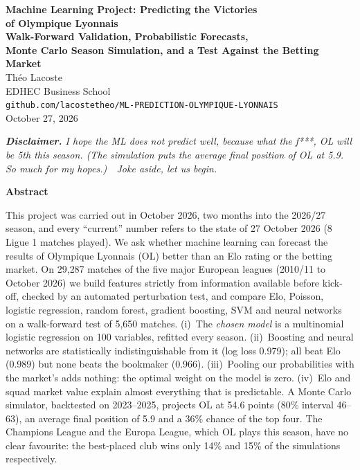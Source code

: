 \documentclass[11pt,a4paper]{article}
\theoremstyle{definition}
\theoremstyle{remark}
\begin{document}
\thispagestyle{fancy}
\begin{center}
{\Large\bfseries Machine Learning Project: Predicting the Victories\\[2pt] of Olympique Lyonnais}\\[10pt]
{\large\bfseries Walk-Forward Validation, Probabilistic Forecasts,\\[1pt] Monte Carlo Season Simulation, and a Test Against the Betting Market}\\[16pt]
{\large Théo Lacoste}\\[2pt]
{\small EDHEC Business School}\\[2pt]
{\small \texttt{github.com/lacostetheo/ML-PREDICTION-OLYMPIQUE-LYONNAIS}}\\[10pt]
{\normalsize October 27, 2026}
\end{center}
\vspace{2pt}
\begin{center}\begin{minipage}{0.88\textwidth}\small\itshape
\textbf{Disclaimer.} I hope the ML does not predict well, because what the f***, OL will be 5th this season.
(The simulation puts the average final position of OL at 5.9. So much for my hopes.)\ \ Joke aside, let us begin.
\end{minipage}\end{center}
\vspace{6pt}
\begin{center}\textbf{Abstract}\end{center}
\vspace{-4pt}
\begin{center}\begin{minipage}{0.88\textwidth}\small
This project was carried out in October 2026, two months into the 2026/27 season, and every ``current'' number refers to the state of 27 October 2026 (8 Ligue 1 matches played).
We ask whether machine learning can forecast the results of Olympique Lyonnais (OL) better than an Elo rating or the betting market.
On 29{,}287 matches of the five major European leagues (2010/11 to October 2026) we build features strictly from information available before kick-off, checked by an automated perturbation test,
and compare Elo, Poisson, logistic regression, random forest, gradient boosting, SVM and neural networks on a walk-forward test of 5{,}650 matches.
(i)~The \emph{chosen model} is a multinomial logistic regression on 100 variables, refitted every season.
(ii)~Boosting and neural networks are statistically indistinguishable from it (log loss 0.979); all beat Elo (0.989) but none beats the bookmaker (0.966).
(iii)~Pooling our probabilities with the market's adds nothing: the optimal weight on the model is zero.
(iv)~Elo and squad market value explain almost everything that is predictable.
A Monte Carlo simulator, backtested on 2023--2025, projects OL at 54.6 points (80\% interval 46--63), an average final position of 5.9 and a 36\% chance of the top four.
The Champions League and the Europa League, which OL plays this season, have no clear favourite: the best-placed club wins only 14\% and 15\% of the simulations respectively.
\end{minipage}\end{center}
\end{document}
